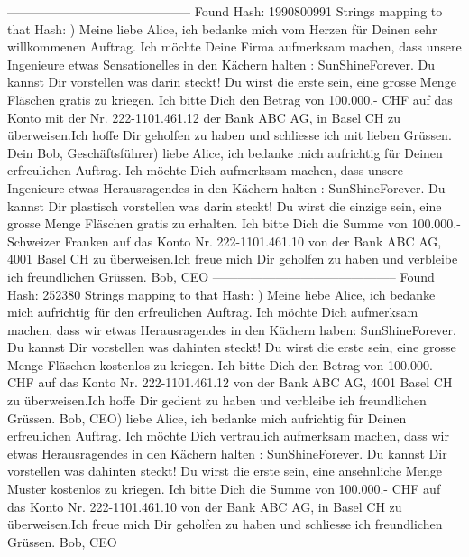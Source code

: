 \documentclass[12pt]{scrartcl}
\begin{document}
--------------------------------------------\newline
Found Hash: 1990800991\newline
Strings mapping to that Hash: ) Meine liebe Alice, ich bedanke mich vom Herzen für Deinen sehr willkommenen Auftrag. Ich möchte Deine Firma aufmerksam machen, dass unsere Ingenieure etwas Sensationelles in den Kächern  halten : SunShineForever. Du kannst Dir  vorstellen was darin steckt! Du wirst die erste  sein, eine grosse Menge Fläschen gratis zu kriegen. Ich bitte Dich den Betrag von 100.000.- CHF auf das Konto mit der Nr. 222-1101.461.12 der  Bank ABC AG, in Basel CH zu überweisen.Ich hoffe Dir geholfen zu haben und schliesse ich mit lieben Grüssen. Dein Bob, Geschäftsführer) liebe Alice, ich bedanke mich aufrichtig für Deinen erfreulichen Auftrag. Ich möchte Dich aufmerksam machen, dass unsere Ingenieure etwas Herausragendes in den Kächern  halten : SunShineForever. Du kannst Dir plastisch vorstellen was darin steckt! Du wirst die einzige sein, eine grosse Menge Fläschen gratis zu erhalten. Ich bitte Dich die Summe von 100.000.- Schweizer Franken auf das Konto Nr. 222-1101.461.10 von der Bank ABC AG, 4001 Basel CH zu überweisen.Ich freue mich Dir geholfen zu haben und verbleibe ich freundlichen Grüssen. Bob, CEO\newline
--------------------------------------------\newline
Found Hash: 252380\newline
Strings mapping to that Hash: ) Meine liebe Alice, ich bedanke mich aufrichtig für den erfreulichen Auftrag. Ich möchte Dich aufmerksam machen, dass wir etwas Herausragendes in den Kächern haben: SunShineForever. Du kannst Dir  vorstellen was dahinten steckt! Du wirst die erste  sein, eine grosse Menge Fläschen kostenlos zu kriegen. Ich bitte Dich den Betrag von 100.000.- CHF auf das Konto Nr. 222-1101.461.12 von der Bank ABC AG, 4001 Basel CH zu überweisen.Ich hoffe Dir gedient zu haben und verbleibe ich freundlichen Grüssen. Bob, CEO) liebe Alice, ich bedanke mich aufrichtig für Deinen erfreulichen Auftrag. Ich möchte Dich vertraulich aufmerksam machen, dass wir etwas Herausragendes in den Kächern  halten : SunShineForever. Du kannst Dir  vorstellen was dahinten steckt! Du wirst die erste  sein, eine ansehnliche Menge Muster kostenlos zu kriegen. Ich bitte Dich die Summe von 100.000.- CHF auf das Konto Nr. 222-1101.461.10 von der Bank ABC AG, in Basel CH zu überweisen.Ich freue mich Dir geholfen zu haben und schliesse ich freundlichen Grüssen. Bob, CEO\newline
\end{document}
